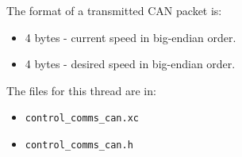 The format of a transmitted CAN packet is:

\begin{itemize}
\item 4 bytes - current speed in big-endian order.
\item 4 bytes - desired speed in big-endian order.
\end{itemize}

The files for this thread are in:

\begin{itemize}
\item \verb!control_comms_can.xc!
\item \verb!control_comms_can.h!
\end{itemize}


